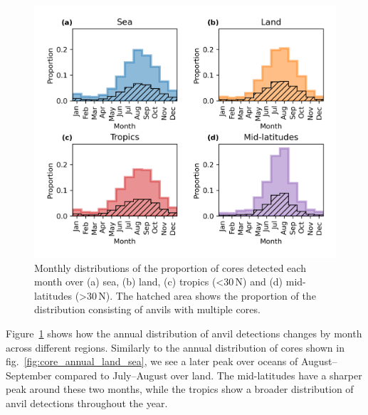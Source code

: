 \begin{figure}[tp]
    \centering
    \includegraphics[width=\textwidth]{figures/chapter2_17.png}
    \caption[
    Monthly distributions of the proportion of cores detected each month over land, sea, tropics and mid-latitudes
    ]{
    Monthly distributions of the proportion of cores detected each month over (a) sea, (b) land, (c) tropics (\textless 30\,\textdegree N) and (d) mid-latitudes (\textgreater 30\,\textdegree N). The hatched area shows the proportion of the distribution consisting of anvils with multiple cores.
    }
    \label{fig:anvil_monthly_cycles}
\end{figure}

Figure~\ref{fig:anvil_monthly_cycles} shows how the annual distribution of anvil detections changes by month across different regions.
Similarly to the annual distribution of cores shown in fig.~\ref{fig:core_annual_land_sea}, we see a later peak over oceans of August--September compared to July--August over land.
The mid-latitudes have a sharper peak around these two months, while the tropics show a broader distribution of anvil detections throughout the year.


